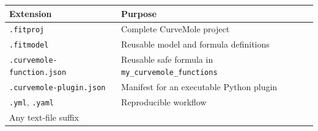 \documentclass[
  10pt,
  a4paper,
  oneside]{scrreprt}
\begin{document}
\begin{longtable}[]{@{}ll@{}}
\toprule
\begin{minipage}[b]{0.47\columnwidth}\raggedright
Extension\strut
\end{minipage} & \begin{minipage}[b]{0.47\columnwidth}\raggedright
Purpose\strut
\end{minipage}\tabularnewline
\midrule
\endhead
\begin{minipage}[t]{0.47\columnwidth}\raggedright
\texttt{.fitproj}\strut
\end{minipage} & \begin{minipage}[t]{0.47\columnwidth}\raggedright
Complete CurveMole project\strut
\end{minipage}\tabularnewline
\begin{minipage}[t]{0.47\columnwidth}\raggedright
\texttt{.fitmodel}\strut
\end{minipage} & \begin{minipage}[t]{0.47\columnwidth}\raggedright
Reusable model and formula definitions\strut
\end{minipage}\tabularnewline
\begin{minipage}[t]{0.47\columnwidth}\raggedright
\texttt{.curvemole-function.json}\strut
\end{minipage} & \begin{minipage}[t]{0.47\columnwidth}\raggedright
Reusable safe formula in \texttt{my\_curvemole\_functions}\strut
\end{minipage}\tabularnewline
\begin{minipage}[t]{0.47\columnwidth}\raggedright
\texttt{.curvemole-plugin.json}\strut
\end{minipage} & \begin{minipage}[t]{0.47\columnwidth}\raggedright
Manifest for an executable Python plugin\strut
\end{minipage}\tabularnewline
\begin{minipage}[t]{0.47\columnwidth}\raggedright
\texttt{.yml}, \texttt{.yaml}\strut
\end{minipage} & \begin{minipage}[t]{0.47\columnwidth}\raggedright
Reproducible workflow\strut
\end{minipage}\tabularnewline
\begin{minipage}[t]{0.47\columnwidth}\raggedright
Any text-file suffix\strut
\end{minipage} & \begin{minipage}[t]{0.47\columnwidth}\raggedright

\end{minipage}
\end{longtable}
\end{document}
